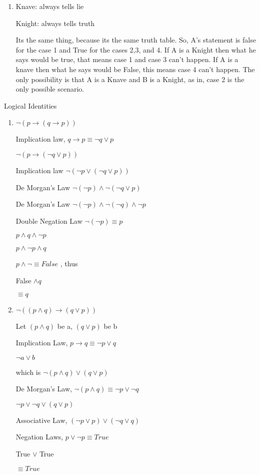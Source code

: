 \documentclass[11pt]{article}
\begin{document}
\begin{enumerate}
\item
Knave: always tells lie

Knight: always tells truth

Its the same thing, because its the same truth table. So, A's statement is false for the case 1 and True for the cases 2,3, and 4. If A is a Knight then what he says would be true, that means case 1 and case 3 can't happen. If A is a knave then what he says would be False, this means case 4 can't happen. The only possibility is that A is a Knave and B is a Knight, as in, case 2 is the only possible scenario.

\end{enumerate}


Logical Identities

\begin{enumerate}

\item
$\lnot(p \rightarrow (q \rightarrow p))$

Implication law, $q \rightarrow p \equiv \lnot q \lor p$

$\lnot(p \rightarrow (\lnot q \lor p))$

Implication law 
$\lnot(\lnot p \lor (\lnot q \lor p))$

De Morgan's Law
$\lnot(\lnot p) \land \lnot (\lnot q \lor p)$

De Morgan's Law
$\lnot(\lnot p) \land \lnot (\lnot q) \land \lnot p$

Double Negation Law 
$\lnot(\lnot p) \equiv p$

$p \land q \land \lnot p$

$p \land \lnot p \land q$

$p \land \lnot \equiv False$ , thus

False $\land q$

$\equiv q$

\item
$\lnot((p \land q) \rightarrow (q \lor p))$

Let $(p \land q)$ be a, $(q \lor p)$ be b

Implication Law, $p \rightarrow q \equiv \lnot p \lor q$

$\lnot a \lor b$

which is $\lnot(p \land q) \lor (q \lor p)$

De Morgan's Law, $\lnot (p \land q) \equiv \lnot p \lor \lnot q$

$\lnot p \lor \lnot q \lor (q \lor p)$

Associative Law, 
$(\lnot p \lor p) \lor (\lnot q \lor q)$

Negation Laws, $p \lor \lnot p \equiv True$

True $\lor$ True

$\equiv True$

\end{enumerate}
\end{document}
